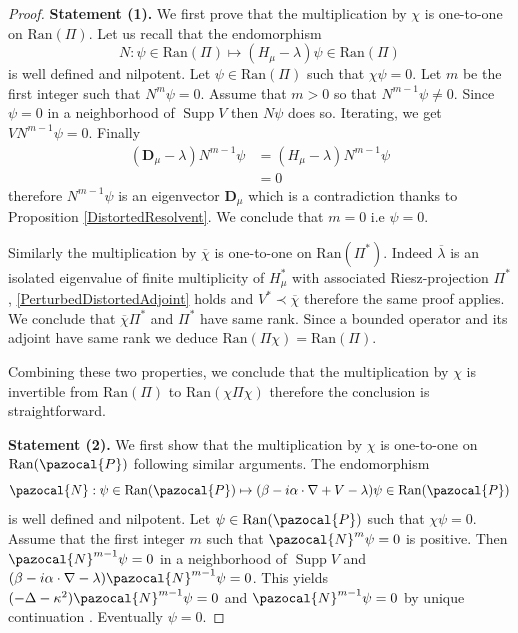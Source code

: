 \documentclass[a4paper, 12pt]{amsart}
\numberwithin{equation}{section}
\newcommand{\Ran}{\mathrm{Ran}} %
\newcommand{\Dvec}{\mathbf{D}}
\newcommand{\Npaz}{\pazocal{N}}
\newcommand{\Ppaz}{\pazocal{P}}
\DeclareMathOperator{\Supp}{\mathrm{Supp}} %
\begin{document}
\begin{proof} 
    \textbf{Statement (1).} We first prove that the multiplication by $\chi$ is one-to-one on $\Ran(\Pi)$. Let us recall that the endomorphism
    \[N:\psi\in\Ran(\Pi)\mapsto(H_\mu-\lambda)\psi\in\Ran(\Pi)\]
    is well defined and nilpotent. Let $\psi\in\Ran(\Pi)$ such that $\chi\psi=0$. Let $m$ be the first integer such that $N^m\psi=0$. Assume that $m>0$ so that $N^{m-1}\psi\not=0$. Since $\psi=0$ in a neighborhood of $\Supp V$ then $N\psi$ does so. Iterating, we get $VN^{m-1}\psi=0$. Finally
    \begin{align*}
        (\Dvec_\mu-\lambda)N^{m-1}\psi&=(H_\mu-\lambda)N^{m-1}\psi\\
        &=0
    \end{align*}
    therefore $N^{m-1}\psi$ is an eigenvector $\Dvec_\mu$ which is a contradiction thanks to Proposition \ref{DistortedResolvent}. We conclude that $m=0$ i.e $\psi=0$. 
    
    Similarly the multiplication by $\overline{\chi}$ is one-to-one on $\Ran(\Pi^*)$. Indeed $\overline{\lambda}$ is an isolated eigenvalue of finite multiplicity of $H_\mu^*$ with associated Riesz-projection $\Pi^*$, \eqref{PerturbedDistortedAdjoint} holds and $V^*\prec\overline{\chi}$ therefore the same proof applies. We conclude that $\overline{\chi}\Pi^*$ and $\Pi^*$ have same rank.  Since a bounded operator and its adjoint have same rank we deduce $\Ran(\Pi\chi)=\Ran(\Pi)$.
    
    Combining these two properties, we conclude that the multiplication by $\chi$ is invertible from $\Ran(\Pi)$ to $\Ran(\chi\Pi\chi)$ therefore the conclusion is straightforward.
    
    \textbf{Statement (2).} We first show that the multiplication by $\chi$ is one-to-one on $\Ran(\Ppaz)$ following similar arguments. The endomorphism
    \[\Npaz :\psi\in\Ran(\Ppaz)\mapsto(\beta-i\alpha\cdot\nabla+V-\lambda)\psi\in\Ran(\Ppaz)\]
    is well defined and nilpotent. Let $\psi\in\Ran(\Ppaz)$ such that $\chi\psi=0$. Assume that the first integer $m$ such that $\Npaz^m\psi=0$ is positive. Then $\Npaz^{m-1}\psi=0$ in a neighborhood of $\Supp V$ and $(\beta-i\alpha\cdot\nabla-\lambda)\Npaz^{m-1}\psi=0$. This yields $(-\Delta-\kappa^2)\Npaz^{m-1}\psi=0$ and $\Npaz^{m-1}\psi=0$ by unique continuation \cite[Theorem XIII.63]{ReSi72}. Eventually $\psi=0$.
    

\end{proof}
\end{document}
